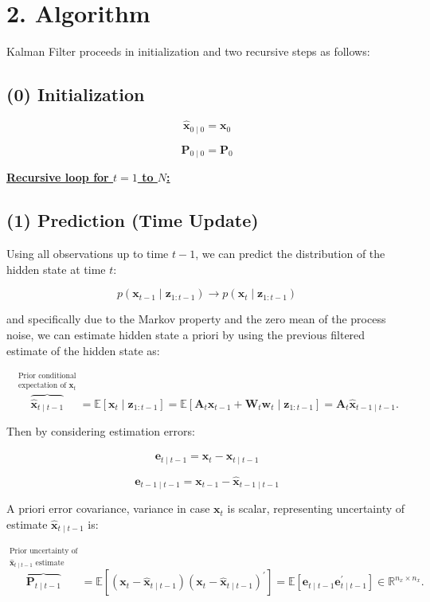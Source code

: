 \documentclass[11pt]{article}
\newcommand{\E}{\mathbb{E}}
\newcommand{\R}{\mathbb{R}}
\newcommand{\trans}{^{\prime}}
\begin{document}
\section*{2. Algorithm}

Kalman Filter proceeds in initialization and two recursive steps as follows:

\subsection*{(0) Initialization}

\[
\widehat{\mathbf{x}}_{0\mid 0}=\mathbf{x}_0
\]

\[
\mathbf{P}_{0\mid 0}=\mathbf{P}_0
\]

\underline{\textbf{Recursive loop for $t=1$ to $N$:}}

\subsection*{(1) Prediction (Time Update)}

Using all observations up to time $t-1$, we can predict the distribution of the hidden state at time $t$:

\[
p\!\left(\mathbf{x}_{t-1}\mid\mathbf{z}_{1:t-1}\right)
\longrightarrow
p\!\left(\mathbf{x}_t\mid\mathbf{z}_{1:t-1}\right)
\]

and specifically due to the Markov property and the zero mean of the process noise, we can estimate hidden state a priori by using the previous filtered estimate of the hidden state as:

\[
\overbrace{\widehat{\mathbf{x}}_{t\mid t-1}}^{\substack{\text{Prior conditional}\\\text{expectation of }\mathbf{x}_t}}
=
\E\!\left[\mathbf{x}_t\mid\mathbf{z}_{1:t-1}\right]
=
\E\!\left[
\mathbf{A}_t\mathbf{x}_{t-1}
+
\mathbf{W}_t\mathbf{w}_t
\mid
\mathbf{z}_{1:t-1}
\right]
=
\mathbf{A}_t\widehat{\mathbf{x}}_{t-1\mid t-1}.
\]

Then by considering estimation errors:

\[
\mathbf{e}_{t\mid t-1}
=
\mathbf{x}_t-
\widehat{\mathbf{x}}_{t\mid t-1}
\]

\[
\mathbf{e}_{t-1\mid t-1}
=
\mathbf{x}_{t-1}-
\widehat{\mathbf{x}}_{t-1\mid t-1}
\]

A priori error covariance, variance in case $\mathbf{x}_t$ is scalar, representing uncertainty of estimate $\widehat{\mathbf{x}}_{t\mid t-1}$ is:

\[
\overbrace{\mathbf{P}_{t\mid t-1}}^{\substack{\text{Prior uncertainty of}\\\widehat{\mathbf{x}}_{t\mid t-1}\text{ estimate}}}
=
\E\!\left[
\left(\mathbf{x}_t-\widehat{\mathbf{x}}_{t\mid t-1}\right)
\left(\mathbf{x}_t-\widehat{\mathbf{x}}_{t\mid t-1}\right)\trans
\right]
=
\E\!\left[
\mathbf{e}_{t\mid t-1}\mathbf{e}_{t\mid t-1}\trans
\right]
\in\R^{n_x\times n_x}.
\]
\end{document}
